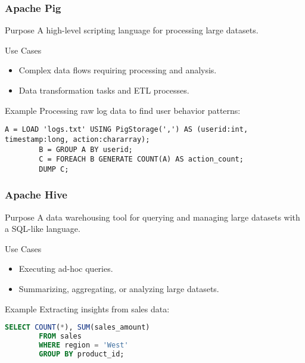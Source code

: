 \documentclass[aspectratio=169]{beamer}
\begin{document}
\begin{frame}[fragile]
    \frametitle{Apache Pig}
    \begin{block}{Purpose}
        A high-level scripting language for processing large datasets.
    \end{block}
    \begin{block}{Use Cases}
        \begin{itemize}
            \item Complex data flows requiring processing and analysis.
            \item Data transformation tasks and ETL processes.
        \end{itemize}
    \end{block}
    \begin{block}{Example}
        Processing raw log data to find user behavior patterns:
        \begin{lstlisting}[language=Pig, style=custom]
        A = LOAD 'logs.txt' USING PigStorage(',') AS (userid:int, timestamp:long, action:chararray);
        B = GROUP A BY userid;
        C = FOREACH B GENERATE COUNT(A) AS action_count;
        DUMP C;
        \end{lstlisting}
    \end{block}
\end{frame}

\begin{frame}[fragile]
    \frametitle{Apache Hive}
    \begin{block}{Purpose}
        A data warehousing tool for querying and managing large datasets with a SQL-like language.
    \end{block}
    \begin{block}{Use Cases}
        \begin{itemize}
            \item Executing ad-hoc queries.
            \item Summarizing, aggregating, or analyzing large datasets.
        \end{itemize}
    \end{block}
    \begin{block}{Example}
        Extracting insights from sales data:
        \begin{lstlisting}[language=SQL, style=custom]
        SELECT COUNT(*), SUM(sales_amount)
        FROM sales
        WHERE region = 'West'
        GROUP BY product_id;
        \end{lstlisting}
    \end{block}
\end{frame}
\end{document}

